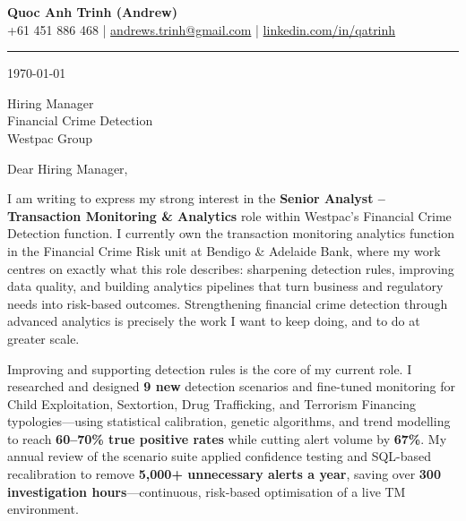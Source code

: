 \documentclass[11pt, a4paper]{article}
\begin{document}
\begin{center}
    {\LARGE \textbf{Quoc Anh Trinh (Andrew)}}\\[4pt]
    {\small
        +61 451 886 468 \quad|\quad
        \href{mailto:andrews.trinh@gmail.com}{andrews.trinh@gmail.com} \quad|\quad
        \href{https://www.linkedin.com/in/qatrinh}{linkedin.com/in/qatrinh}
    }
\end{center}

\vspace{4pt}
\hrule
\vspace{14pt}

\today

\vspace{8pt}

Hiring Manager\\
Financial Crime Detection\\
Westpac Group

\vspace{10pt}

Dear Hiring Manager,

I am writing to express my strong interest in the \textbf{Senior Analyst -- Transaction Monitoring \& Analytics} role within Westpac's Financial Crime Detection function. I currently own the transaction monitoring analytics function in the Financial Crime Risk unit at Bendigo \& Adelaide Bank, where my work centres on exactly what this role describes: sharpening detection rules, improving data quality, and building analytics pipelines that turn business and regulatory needs into risk-based outcomes. Strengthening financial crime detection through advanced analytics is precisely the work I want to keep doing, and to do at greater scale.

Improving and supporting detection rules is the core of my current role. I researched and designed \textbf{9 new} detection scenarios and fine-tuned monitoring for Child Exploitation, Sextortion, Drug Trafficking, and Terrorism Financing typologies—using statistical calibration, genetic algorithms, and trend modelling to reach \textbf{60--70\% true positive rates} while cutting alert volume by \textbf{67\%}. My annual review of the scenario suite applied confidence testing and SQL-based recalibration to remove \textbf{5,000+ unnecessary alerts a year}, saving over \textbf{300 investigation hours}—continuous, risk-based optimisation of a live TM environment.
\end{document}
